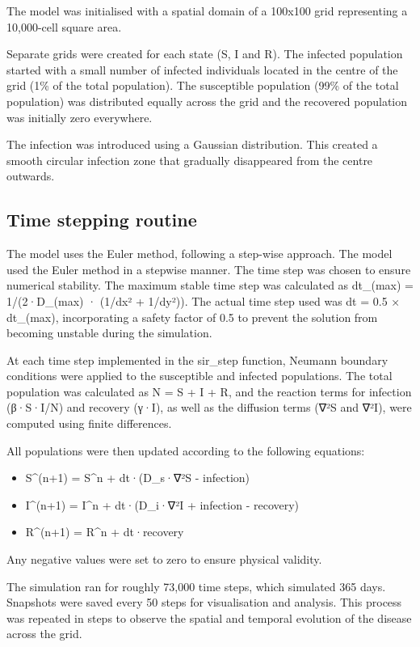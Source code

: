 \documentclass[
  letterpaper,
  DIV=11,
  numbers=noendperiod]{scrartcl}
\begin{document}
The model was initialised with a spatial domain of a 100x100 grid
representing a 10,000-cell square area.

Separate grids were created for each state (S, I and R). The infected
population started with a small number of infected individuals located
in the centre of the grid (1\% of the total population). The susceptible
population (99\% of the total population) was distributed equally across
the grid and the recovered population was initially zero everywhere.

The infection was introduced using a Gaussian distribution. This created
a smooth circular infection zone that gradually disappeared from the
centre outwards.

\subsection{Time stepping routine}\label{time-stepping-routine}

The model uses the Euler method, following a step-wise approach. The
model used the Euler method in a stepwise manner. The time step was
chosen to ensure numerical stability. The maximum stable time step was
calculated as dt\_(max) = 1/(2·D\_(max) · (1/dx² + 1/dy²)). The actual
time step used was dt = 0.5 × dt\_(max), incorporating a safety factor
of 0.5 to prevent the solution from becoming unstable during the
simulation.

At each time step implemented in the sir\_step function, Neumann
boundary conditions were applied to the susceptible and infected
populations. The total population was calculated as N = S + I + R, and
the reaction terms for infection (β·S·I/N) and recovery (γ·I), as well
as the diffusion terms (∇²S and ∇²I), were computed using finite
differences.

All populations were then updated according to the following equations:

\begin{itemize}
\item
  S\^{}(n+1) = S\^{}n + dt·(D\_s·∇²S - infection)
\item
  I\^{}(n+1) = I\^{}n + dt·(D\_i·∇²I + infection - recovery)
\item
  R\^{}(n+1) = R\^{}n + dt·recovery
\end{itemize}

Any negative values were set to zero to ensure physical validity.

The simulation ran for roughly 73,000 time steps, which simulated 365
days. Snapshots were saved every 50 steps for visualisation and
analysis. This process was repeated in steps to observe the spatial and
temporal evolution of the disease across the grid.
\end{document}
